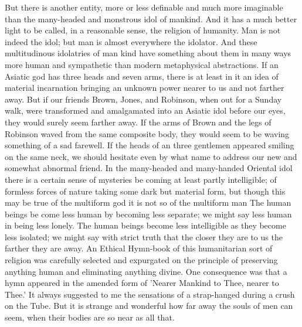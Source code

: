 But there is another entity, more or less definable and much more imaginable than the many-headed and monstrous idol of mankind. And it has a much better light to be called, in a reasonable sense, the religion of humanity. Man is not indeed the idol; but man is almost everywhere the idolator. And these multitudinous idolatries of man kind have something about them in many ways more human and sympathetic than modern metaphysical abstractions. If an Asiatic god has three heads and seven arms, there is at least in it an idea of material incarnation bringing an unknown power nearer to us and not farther away. But if our friends Brown, Jones, and Robinson, when out for a Sunday walk, were transformed and amalgamated into an Asiatic idol before our eyes, they would surely seem farther away. If the arms of Brown and the legs of Robinson waved from the same composite body, they would seem to be waving something of a sad farewell. If the heads of an three gentlemen appeared smiling on the same neck, we should hesitate even by what name to address our new and somewhat abnormal friend. In the many-headed and many-handed Oriental idol there is a certain sense of mysteries be coming at least partly intelligible; of formless forces of nature taking some dark but material form, but though this may be true of the multiform god it is not so of the multiform man The human beings be come less human by becoming less separate; we might say less human in being less lonely. The human beings become less intelligible as they become less isolated; we might say with strict truth that the closer they are to us the farther they are away. An Ethical Hymn-book of this humanitarian sort of religion was carefully selected and expurgated on the principle of preserving anything human and eliminating anything divine. One consequence was that a hymn appeared in the amended form of 'Nearer Mankind to Thee, nearer to Thee.' It always suggested to me the sensations of a strap-hanged during a crush on the Tube. But it is strange and wonderful how far away the souls of men can seem, when their bodies are so near as all that.

